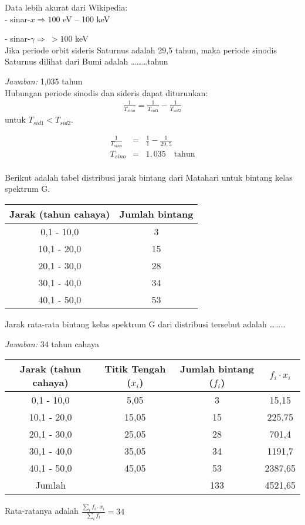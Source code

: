 \documentclass[11pt,fleqn]{exam}
\begin{document}
\begin{questions}
Data lebih akurat dari Wikipedia:\\
- sinar-$x \Rightarrow 100$ eV \--- 100 keV

- sinar-$\gamma \Rightarrow ~> 100$ keV\\






\question [10] Jika periode orbit sideris Saturnus adalah 29,5 tahun, maka periode sinodis Saturnus dilihat dari Bumi adalah \ldots\ldots\ldots tahun

\textit{Jawaban: } 1,035 tahun\\

Hubungan periode sinodis dan sideris dapat diturunkan:
\begin{eqnarray*}
\frac{1}{T_{sino}} = \frac{1}{T_{sid1}} - \frac{1}{T_{sid2}}
\end{eqnarray*}
untuk $T_{sid1} < T_{sid2}$. 

\begin{eqnarray*}
\frac{1}{T_{sino}} &=& \frac{1}{1} - \frac{1}{29,5}\\
T_{sino} &=& 1,035 \quad \text{tahun}
\end{eqnarray*}\\


\question [10] Berikut adalah tabel distribusi jarak bintang dari Matahari untuk bintang kelas spektrum G.


\begin{center}
\begin{tabular}{|c|c|}
\hline 
Jarak (tahun  cahaya) & Jumlah bintang \\ 
\hline 
0,1 - 10,0 & 3 \\ 
\hline 
10,1 - 20,0 & 15 \\ 
\hline 
20,1 - 30,0 & 28 \\ 
\hline 
30,1 - 40,0 & 34 \\ 
\hline 
40,1 - 50,0 & 53 \\ 
\hline 
\end{tabular} 
\end{center}

Jarak rata-rata bintang kelas spektrum G dari distribusi tersebut adalah \ldots\ldots\ldots

\textit{Jawaban: } 34 tahun cahaya\\

\begin{center}
\begin{tabular}{|c|c|c|c|}
\hline 
Jarak (tahun  cahaya) & Titik Tengah ($x_i$) & Jumlah bintang ($f_i$) & $f_i \cdot x_i$ \\ 
\hline 
0,1 - 10,0 & 5,05 & 3 & 15,15\\ 
\hline 
10,1 - 20,0 & 15,05 & 15 & 225,75\\ 
\hline 
20,1 - 30,0 & 25,05 & 28 & 701,4\\ 
\hline 
30,1 - 40,0 & 35,05 & 34 & 1191,7\\ 
\hline 
40,1 - 50,0 & 45,05 & 53 & 2387,65\\ 
\hline 
Jumlah & & 133 & 4521,65\\
\hline
\end{tabular} 
\end{center}

Rata-ratanya adalah $\frac{\sum_i f_i \cdot x_i}{\sum_i f_i} = 34$

\end{questions}
\end{document}
